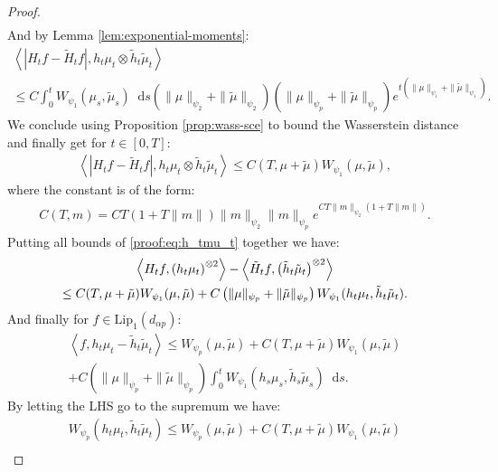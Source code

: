 \documentclass[11pt,a4paper]{article}
\newcommand{\brac}[1]{\left\langle#1\right\rangle}
\newcommand{\dd}{\mathop{}\!\mathrm{d}}
\begin{document}
\begin{proof}
\begin{align*}
    \end{align*}
    And by Lemma \ref{lem:exponential-moments}:
    \begin{multline*}
        \brac{\left|H_tf - \tilde{H}_tf\right|,h_t\mu_t \otimes \tilde{h}_t \tilde{\mu}_t} \\
         \leq C\int_0^t W_{\psi_1}(\mu_s,\tilde{\mu}_s)\dd s \left(\|\mu\|_{\psi_2} + \|\tilde{\mu}\|_{\psi_2} \right)\left(\|\mu\|_{\psi_{p}}+ \|\tilde{\mu}\|_{\psi_{p}} \right) e^{t\left(\|\mu\|_{\psi_1} + \|\tilde{\mu}\|_{\psi_1}\right)}.
    \end{multline*}
    We conclude using Proposition \ref{prop:wass-sce} to bound the Wasserstein distance and finally get for $t \in [0,T]$:
    \begin{align*}
        \brac{\left|H_tf - \tilde{H}_tf\right|,h_t\mu_t \otimes \tilde{h}_t \tilde{\mu}_t}  \leq C(T,\mu + \tilde{\mu})  W_{\psi_1}(\mu,\tilde{\mu}),
    \end{align*}
    where the constant is of the form:
    \begin{align*}
        C(T,m) = CT\left( 1 + T\|m\|\right)\|m\|_{\psi_2} \|m\|_{\psi_{p}}e^{CT\|m\|_{\psi_2}\left(1 + T\|m\|\right)}.
    \end{align*}
    Putting all bounds of \eqref{proof:eq:h_tmu_t} together we have:
    \begin{multline*}
        \brac{H_tf,\left(h_t\mu_t\vphantom{\tilde{\mu}}\right)^{\otimes 2}} - \brac{\tilde{H}_tf,\left(\tilde{h}_t\tilde{\mu}_t\right)^{\otimes 2}}\\
        \leq C(T,\mu + \tilde{\mu}) W_{\psi_1}(\mu,\tilde{\mu}) + C\left(\|\mu\|_{\psi_{p}}+ \|\tilde{\mu}\|_{\psi_{p}} \right)W_{\psi_1}(h_t\mu_t, \tilde{h}_t \tilde{\mu}_t) .
    \end{multline*}
    And finally for $f \in \text{Lip}_1(d_{\alpha p})$:
    \begin{multline*}
        \brac{f, h_t\mu_t - \tilde{h}_t\tilde{\mu}_t} \leq W_{\psi_p}(\mu,\tilde{\mu}) +  C(T,\mu + \tilde{\mu}) W_{\psi_1}(\mu,\tilde{\mu})\\
         + C\left(\|\mu\|_{\psi_{p}}+ \|\tilde{\mu}\|_{\psi_{p}} \right)\int_0^t W_{\psi_1}(h_s\mu_s, \tilde{h}_s \tilde{\mu}_s) \dd s.
    \end{multline*}
    By letting the LHS go to the supremum we have:
    \begin{multline*}
        W_{\psi_p} \left(h_t\mu_t ,\tilde{h}_t\tilde{\mu}_t\right) \leq W_{\psi_p}(\mu,\tilde{\mu}) +  C(T,\mu + \tilde{\mu}) W_{\psi_1}(\mu,\tilde{\mu})\\

\end{multline*}
\end{proof}
\end{document}
